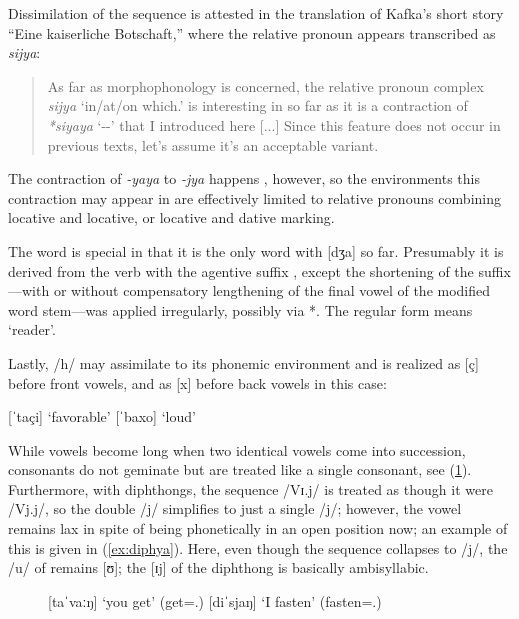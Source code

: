 Dissimilation of the sequence  is
attested in the translation of Kafka's short story ``Eine kaiserliche
Botschaft,'' where the relative pronoun  appears transcribed
as \textit{sijya}:

\blockcquote[12]{becker:kafka:imperial}{As far as morphophonology is concerned,
the relative pronoun complex \textit{sijya} `in/at/on which.\Loc{}' is
interesting in so far as it is a contraction of \textit{*siyaya}
`\Rel{}-\Loc{}-\Loc{}' that I introduced here [...] Since this feature does not
occur in previous texts, let's assume it's an acceptable variant.}

The contraction of \textit{-yaya} to \textit{-jya} happens
, however, so the environments this contraction may appear in are
effectively limited to relative pronouns combining locative and locative, or
locative and dative marking.

The word  is special in that it is the only word
with  [dʒa] so far. Presumably it is derived from the verb
 with the agentive suffix , except the
shortening of the suffix---with or without compensatory lengthening of the
final vowel of the modified word stem---was applied irregularly, possibly via
*. The regular form  means `reader'.

Lastly, /h/ may assimilate to its phonemic environment and is realized as 
[ç] before front vowels, and as [x] before back vowels in this case:

\pex
	\a {} [ˈtaçi] `favorable'
	\a {} [ˈbaxo] `loud'
\xe

While vowels become long when two identical vowels come into succession,
consonants do not geminate but are treated like a single consonant, see
(\ref{ex:geminates}). Furthermore, with diphthongs, the
sequence /Vɪ.j/ is treated as though it were /Vj.j/, so the double /j/
simplifies to just a single /j/; however, the vowel remains lax in spite of
being phonetically in an open position now; an example of this is given in
(\ref{ex:diphya}). Here, even though the  sequence collapses to /j/,
the /u/ of  remains [ʊ]; the [ɪ\til{}j] of the diphthong is
basically ambisyllabic.

\begin{figure}[h]
\pex\label{ex:geminates}
	\a {} [taˈvaːŋ] `you get' 
		(get=\Ssg{}.\Aarg{})
	\a {} [diˈsjaŋ] `I fasten' 
		(fasten=\Fsg{}.\Aarg{})
\xe
\end{figure}

